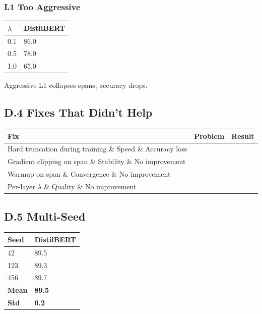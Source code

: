 \subsubsection{L1 Too Aggressive}
\begin{table}[H]
\centering
\small
\begin{tabular}{ll}
\toprule
\textbf{$\lambda$} & \textbf{DistilBERT} \\
\midrule
0.1 & 86.0 \\
0.5 & 78.0 \\
1.0 & 65.0 \\
\bottomrule
\end{tabular}
\end{table}

Aggressive L1 collapses spans; accuracy drops.

\subsection{D.4 Fixes That Didn't Help}

\begin{table}[H]
\centering
\small
\begin{tabular}{lll}
\toprule
\textbf{Fix} & \textbf{Problem} & \textbf{Result} \\
\midrule
Hard truncation during training \& Speed \& Accuracy loss \\
Gradient clipping on span \& Stability \& No improvement \\
Warmup on span \& Convergence \& No improvement \\
Per-layer $\lambda$ \& Quality \& No improvement \\
\bottomrule
\end{tabular}
\end{table}

\subsection{D.5 Multi-Seed}

\begin{table}[H]
\centering
\small
\begin{tabular}{ll}
\toprule
\textbf{Seed} & \textbf{DistilBERT} \\
\midrule
42 & 89.5 \\
123 & 89.3 \\
456 & 89.7 \\
\textbf{Mean} & \textbf{89.5} \\
\textbf{Std} & \textbf{0.2} \\
\bottomrule
\end{tabular}
\end{table}

